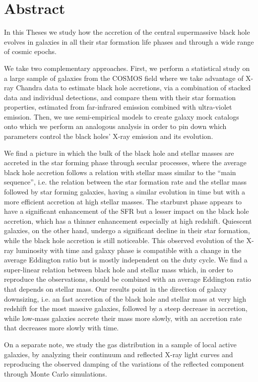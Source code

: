 \chapter*{Abstract}

In this Theses we study how the accretion of the central supermassive black hole evolves in galaxies in all their star formation life phases and through a wide range of cosmic epochs. 

We take two complementary approaches. First, we perform a statistical study on a large sample of galaxies from the COSMOS field where we take advantage of X-ray Chandra data to estimate black hole accretions, via a combination of stacked data and individual detections, and compare them with their star formation properties, estimated from far-infrared emission combined with ultra-violet emission. Then, we use semi-empirical models to create galaxy mock catalogs onto which we perform an analogous analysis in order to pin down which parameters control the black holes' X-ray emission and its evolution.


We find a picture in which the bulk of the black hole and stellar masses are accreted in the star forming phase through secular processes, where the average black hole accretion follows a relation with stellar mass similar to the ``main sequence'', i.e. the relation between the star formation rate and the stellar mass followed by star forming galaxies, having a similar evolution in time but with a more efficient accretion at high stellar masses.
The starburst phase appears to have a significant enhancement of the SFR but a lesser impact on the black hole accretion, which has a thinner enhancement especially at high redshift. 
Quiescent galaxies, on the other hand, undergo a significant decline in their star formation, while the black hole accretion is still noticeable.
This observed evolution of the X-ray luminosity with time and galaxy phase is compatible with a change in the average Eddington ratio but is mostly independent on the duty cycle.
We find a super-linear relation between black hole and stellar mass which, in order to reproduce the observations, should be combined with an average Eddington ratio that depends on stellar mass.
Our results point in the direction of galaxy downsizing, i.e. an fast accretion of the black hole and stellar mass at very high redshift for the most massive galaxies, followed by a steep decrease in accretion, while low-mass galaxies accrete their mass more slowly, with an accretion rate that decreases more slowly with time.

On a separate note, we study the gas distribution in a sample of local active galaxies, by analyzing their continuum and reflected X-ray light curves and reproducing the observed damping of the variations of the reflected component through Monte Carlo simulations.